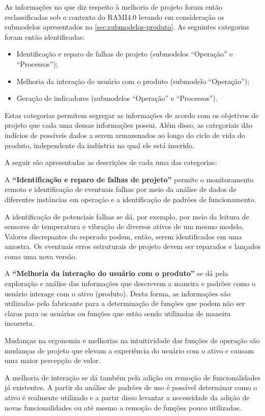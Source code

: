As informações no que diz respeito à melhoria de projeto foram então reclassificadas sob o contexto do RAMI4.0 levando em consideração os submodelos apresentados na \autoref{sec:submodelos-produto}. As seguintes categorias foram então identificadas:

\begin{itemize}
	\item Identificação e reparo de falhas de projeto (submodelos ``Operação'' e ``Processos'');
	\item Melhoria da interação do usuário com o produto (submodelo ``Operação'');
	\item Geração de indicadores (submodelos ``Operação'' e ``Processos'').
\end{itemize}

Estas categorias permitem segregar as informações de acordo com os objetivos de projeto que cada uma dessas informações possui. Além disso, as categoriais dão indícios de possíveis dados a serem armazenados ao longo do ciclo de vida do produto, independente da indústria na qual ele está inserido.

A seguir são apresentadas as descrições de cada uma das categorias:

A \textbf{``Identificação e reparo de falhas de projeto''} permite o monitoramento remoto e identificação de eventuais falhas por meio da análise de dados de diferentes instâncias em operação e a identificação de padrões de funcionamento.

A identificação de potenciais falhas se dá, por exemplo, por meio da leitura de sensores de temperatura e vibração de diversos ativos de um mesmo modelo. Valores discrepantes do esperado podem, então, serem identificados em uma amostra. Os eventuais erros estruturais de projeto devem ser reparados e lançados como uma nova versão.

A \textbf{``Melhoria da interação do usuário com o produto''} se dá pela exploração e análise das informações que descrevem a maneira e padrões como o usuário interage com o ativo (produto). Desta forma, as informações são utilizadas pelo fabricante para a determinação de funções que podem não ser claras para os usuários ou funções que estão sendo utilizadas de maneira incorreta.

Mudanças na ergonomia e melhorias na intuitividade das funções de operação são mudanças de projeto que elevam a experiência do usuário com o ativo e causam uma maior percepção de valor.

A melhoria de interação se dá também pela adição ou remoção de funcionalidades já existentes. A partir da análise de padrões de uso é possível determinar como o ativo é realmente utilizado e a partir disso levantar a necessidade da adição de novas funcionalidades ou até mesmo a remoção de funções pouco utilizadas.


